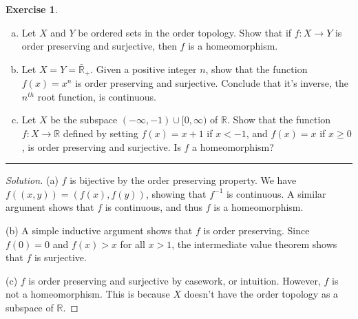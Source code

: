 \documentclass{article}
\theoremstyle{definition}
\newtheorem{exercise}{Exercise}[section]
\begin{document}
\pagebreak

\begin{exercise}
  \begin{enumerate}[(a)]
    \item Let $X$ and $Y$ be ordered sets in the order topology. Show that if $f:X\to Y$ is order preserving and surjective, then $f$ is a homeomorphism.
    \item Let $X = Y = \bar{\mathbb{R}}_+$. Given a positive integer $n$, show that the function $f(x) = x^n$ is order preserving and surjective. Conclude that it's inverse, the $n^{th}$ root function, is continuous.
    \item Let $X$ be the subspace $(-\infty, -1)\cup[0,\infty)$ of $\mathbb{R}$. Show that the function $f:X\to\mathbb{R}$ defined by setting $f(x) = x+1$ if $x < -1$, and $f(x) = x$ if $x\ge 0$, is order preserving and surjective. Is $f$ a homeomorphism?
  \end{enumerate}
\end{exercise}
\hrule
\begin{proof}[Solution]
  (a) $f$ is bijective by the order preserving property. We have $f((x,y)) = (f(x),f(y))$, showing that $f^{-1}$ is continuous. A similar argument shows that $f$ is continuous, and thus $f$ is a homeomorphism.

  (b) A simple inductive argument shows that $f$ is order preserving. Since $f(0) = 0$ and $f(x) > x$ for all $x > 1$, the intermediate value theorem shows that $f$ is surjective.

  (c) $f$ is order preserving and surjective by casework, or intuition. However, $f$ is not a homeomorphism. This is because $X$ doesn't have the order topology as a subspace of $\mathbb{R}$.
\end{proof}

\pagebreak
\end{document}
